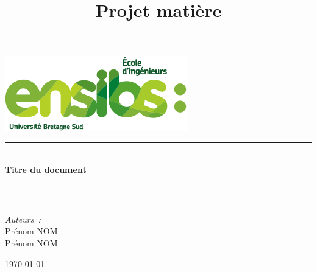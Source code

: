 \documentclass[12pt]{article}
\title{Projet matière}
\begin{document}
\begin{titlepage}

\newcommand{\HRule}{\rule{\linewidth}{0.5mm}}

\center %
 

\includegraphics[scale=1]{assets/ensibs.png}\\[1cm] %


\HRule \\[0.4cm]
{ \huge \bfseries Titre du document
}\\[0.4cm]
\HRule \\[1.5cm]
 



\begin{flushleft} \large
\emph{Auteurs :}\\
Prénom \textsc{NOM}\\
Prénom \textsc{NOM}\\
\end{flushleft}



{\large \today}\\[2cm] %

\vfill %

\end{titlepage}
\end{document}
